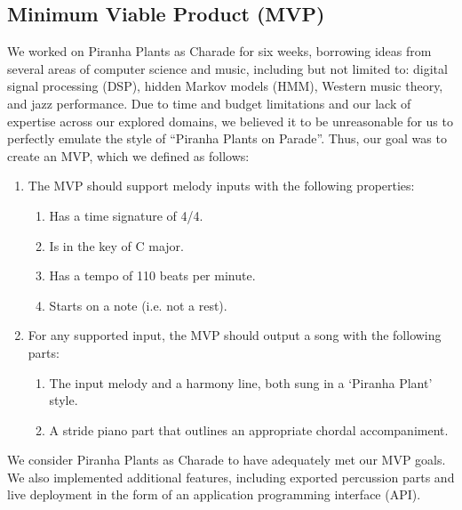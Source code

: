 \subsection{Minimum Viable Product (MVP)}

We worked on Piranha Plants as Charade for six weeks, borrowing ideas from several areas of computer science and music, including but not limited to: digital signal processing (DSP), hidden Markov models (HMM), Western music theory, and jazz performance. Due to time and budget limitations and our lack of expertise across our explored domains, we believed it to be unreasonable for us to perfectly emulate the style of ``Piranha Plants on Parade''. Thus, our goal was to create an MVP, which we defined as follows:
\begin{enumerate}
    \item The MVP should support melody inputs with the following properties:
    \begin{enumerate}
        \item Has a time signature of 4/4.
        \item Is in the key of C major.
        \item Has a tempo of 110 beats per minute.
        \item Starts on a note (i.e. not a rest).
    \end{enumerate}
    \item For any supported input, the MVP should output a song with the following parts:
    \begin{enumerate}
        \item The input melody and a harmony line, both sung in a `Piranha Plant' style.
        \item A stride piano part that outlines an appropriate chordal accompaniment.
    \end{enumerate}
\end{enumerate}

We consider Piranha Plants as Charade to have adequately met our MVP goals. We also implemented additional features, including exported percussion parts and live deployment in the form of an application programming interface (API).
